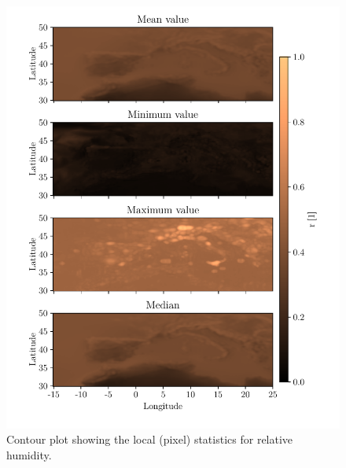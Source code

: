 \begin{figure}[ht]
    \centering
    \includegraphics{python_figs/all_stat_variable_r.pdf}
    \caption{Contour plot showing the local (pixel) statistics for relative humidity.}
    \label{fig:all_stats_r}
\end{figure}
